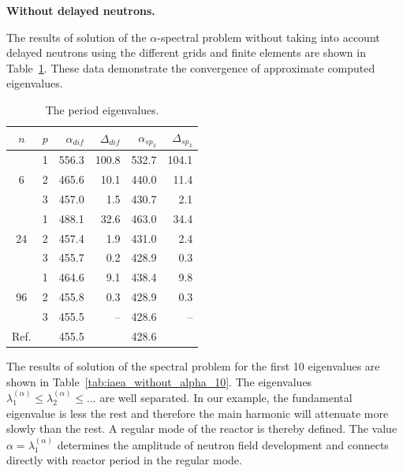 \documentclass[authoryear]{elsarticle}
\begin{document}
\textbf{Without delayed neutrons.}

The results of solution of the $\alpha$-spectral problem without taking into account delayed neutrons using the different grids and finite elements are shown in Table~\ref{tab:iaea_without_alpha}.
These data demonstrate the convergence of approximate computed eigenvalues.

\begin{table}[htp]
\caption{The period eigenvalues.}
\label{tab:iaea_without_alpha}
\begin{center}
\begin{tabular}{c c r r r r}
\hline
$n$ & $p$ & $\alpha_{dif}$ & $\Delta_{dif}$ &$\alpha_{sp_3}$& $\Delta_{sp_3}$ \\
\hline
	& 1	& 556.3 & 100.8 & 532.7 & 104.1\\
6	& 2	& 465.6 & 10.1 & 440.0 & 11.4\\
	& 3	& 457.0 &  1.5 & 430.7 & 2.1\\ 
\hline
	& 1	& 488.1 & 32.6 & 463.0 & 34.4\\
24& 2	& 457.4 & 1.9 & 431.0 & 2.4\\
	& 3	& 455.7 & 0.2 & 428.9 & 0.3\\ 
\hline
	& 1	& 464.6 & 9.1 & 438.4 & 9.8\\
96& 2	& 455.8 & 0.3 & 428.9 & 0.3\\
	& 3	& 455.5 & -- & 428.6 & -- \\ 
\hline
Ref.& & 455.5 & & 428.6 \\ 
\hline
\end{tabular}
\end{center}
\end{table}

The results of solution of the spectral problem for the first 10 eigenvalues are shown in Table~\ref{tab:iaea_without_alpha_10}.
The eigenvalues $\lambda_1^{(\alpha)} \leq \lambda_2^{(\alpha)} \leq ...$ are well separated. 
In our example, the fundamental eigenvalue is less the rest and therefore the main harmonic  will attenuate more slowly than the rest.
A regular mode of the reactor is thereby defined.
The value $\alpha = \lambda_1^{(\alpha)}$ determines the amplitude of neutron field development and connects directly with reactor period in the regular mode.
\end{document}
